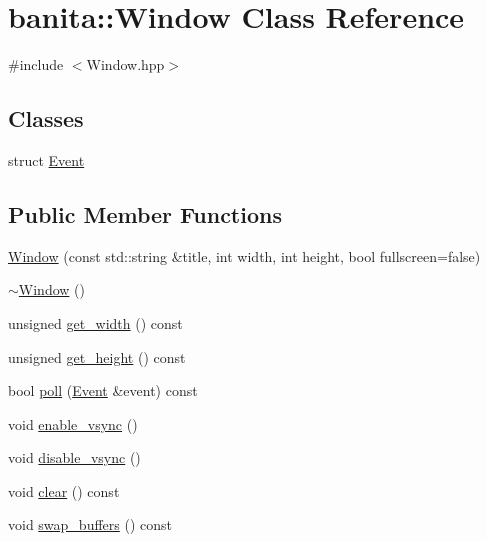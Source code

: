 \hypertarget{classbanita_1_1_window}{}\section{banita\+::Window Class Reference}
\label{classbanita_1_1_window}


{\ttfamily \#include $<$Window.\+hpp$>$}

\subsection*{Classes}
\begin{DoxyCompactItemize}
\item 
struct \mbox{\hyperlink{structbanita_1_1_window_1_1_event}{Event}}
\end{DoxyCompactItemize}
\subsection*{Public Member Functions}
\begin{DoxyCompactItemize}
\item 
\mbox{\hyperlink{classbanita_1_1_window_ae0a1e293ad0a06d2c76faffb2ea2584a}{Window}} (const std\+::string \&title, int width, int height, bool fullscreen=false)
\item 
\mbox{\hyperlink{classbanita_1_1_window_a7dc6f77899cbb641225ef36b1ab2f83a}{$\sim$\+Window}} ()
\item 
unsigned \mbox{\hyperlink{classbanita_1_1_window_a5ff600fc2263ed812abbc9395d7a5dde}{get\+\_\+width}} () const
\item 
unsigned \mbox{\hyperlink{classbanita_1_1_window_a795dd72e44eb07310830aa516d4d9b99}{get\+\_\+height}} () const
\item 
bool \mbox{\hyperlink{classbanita_1_1_window_aee3634f0202d871a8fb9cf477cf23a15}{poll}} (\mbox{\hyperlink{structbanita_1_1_window_1_1_event}{Event}} \&event) const
\item 
void \mbox{\hyperlink{classbanita_1_1_window_ace182aba92f36eeb05a63160b9f269f8}{enable\+\_\+vsync}} ()
\item 
void \mbox{\hyperlink{classbanita_1_1_window_a1fe74bf9ef2333299983ee6198c13f91}{disable\+\_\+vsync}} ()
\item 
void \mbox{\hyperlink{classbanita_1_1_window_a535e8db0d7c55078fb708dcacf1226e8}{clear}} () const
\item 
void \mbox{\hyperlink{classbanita_1_1_window_a87aa2169094bc025281540a81cfc96a8}{swap\+\_\+buffers}} () const
\end{DoxyCompactItemize}


